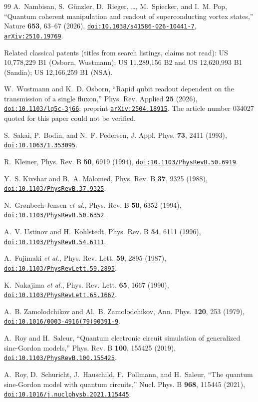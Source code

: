 \documentclass[10pt,twocolumn,letterpaper]{article}
\newcommand{\doi}[1]{\href{https://doi.org/#1}{\nolinkurl{doi:#1}}}
\newcommand{\arxiv}[1]{\href{https://arxiv.org/abs/#1}{\nolinkurl{arXiv:#1}}}
\begin{document}
\begin{thebibliography}{99}
A.~Nambisan, S.~G{\"u}nzler, D.~Rieger, \ldots, M.~Spiecker, and I.~M. Pop, ``Quantum coherent manipulation and
readout of superconducting vortex states,'' Nature \textbf{653}, 63--67 (2026), \doi{10.1038/s41586-026-10441-7},
\arxiv{2510.19769}.

Related classical patents (titles from search listings, claims not read): US 10,778,229 B1 (Osborn, Wustmann);
US 11,289,156 B2 and US 12,620,993 B1 (Sandia); US 12,166,259 B1 (NSA).

W.~Wustmann and K.~D. Osborn, ``Rapid qubit readout dependent on the transmission of a single fluxon,'' Phys. Rev.
Applied \textbf{25} (2026), \doi{10.1103/lq5c-3j66}; preprint \arxiv{2504.18915}. The article number 034027 quoted
for this paper could not be verified.

S.~Sakai, P.~Bodin, and N.~F. Pedersen, J. Appl. Phys. \textbf{73}, 2411 (1993), \doi{10.1063/1.353095}.

R.~Kleiner, Phys. Rev. B \textbf{50}, 6919 (1994), \doi{10.1103/PhysRevB.50.6919}.

Y.~S. Kivshar and B.~A. Malomed, Phys. Rev. B \textbf{37}, 9325 (1988), \doi{10.1103/PhysRevB.37.9325}.

N.~Gr{\o}nbech-Jensen \emph{et al.}, Phys. Rev. B \textbf{50}, 6352 (1994), \doi{10.1103/PhysRevB.50.6352}.

A.~V. Ustinov and H.~Kohlstedt, Phys. Rev. B \textbf{54}, 6111 (1996), \doi{10.1103/PhysRevB.54.6111}.

A.~Fujimaki \emph{et al.}, Phys. Rev. Lett. \textbf{59}, 2895 (1987), \doi{10.1103/PhysRevLett.59.2895}.

K.~Nakajima \emph{et al.}, Phys. Rev. Lett. \textbf{65}, 1667 (1990), \doi{10.1103/PhysRevLett.65.1667}.

A.~B. Zamolodchikov and Al.~B. Zamolodchikov, Ann. Phys. \textbf{120}, 253 (1979),
\doi{10.1016/0003-4916(79)90391-9}.

A.~Roy and H.~Saleur, ``Quantum electronic circuit simulation of generalized sine-Gordon models,'' Phys. Rev. B
\textbf{100}, 155425 (2019), \doi{10.1103/PhysRevB.100.155425}.

A.~Roy, D.~Schuricht, J.~Hauschild, F.~Pollmann, and H.~Saleur, ``The quantum sine-Gordon model with quantum
circuits,'' Nucl. Phys. B \textbf{968}, 115445 (2021), \doi{10.1016/j.nuclphysb.2021.115445}.


\end{thebibliography}
\end{document}
